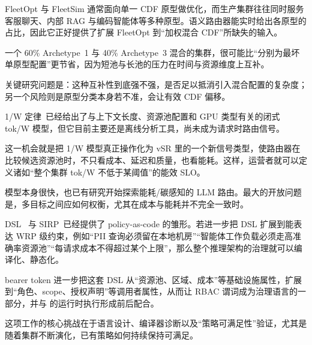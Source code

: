\begin{opportunity}[混合原型的集群配置]
\label{opp:mixed-archetype}
FleetOpt 与 FleetSim 通常面向单一 CDF 原型做优化，而生产集群往往同时服务客服聊天、内部 RAG 与编码智能体等多种原型。语义路由器能实时给出各原型的占比，因此它正好提供了扩展 FleetOpt 到“加权混合 CDF”所缺失的输入。

一个 60\% Archetype~1 与 40\% Archetype~3 混合的集群，很可能比“分别为最坏单原型配置”更节省，因为短池与长池的压力在时间与资源维度上互补。

\begin{frisk}
关键研究问题是：这种互补性到底强不强，是否足以抵消引入混合配置的复杂度；另一个风险则是原型分类本身若不准，会让有效 CDF 偏移。
\end{frisk}
\end{opportunity}

\begin{opportunity}[把能耗作为可组合路由目标]
\label{opp:energy-signal}
1/W 定律~\cite{onewlaw2026}已经给出了与上下文长度、资源池配置和 GPU 类型有关的闭式 tok/W 模型，但它目前主要还是离线分析工具，尚未成为请求时路由信号。

这一机会就是把 1/W 模型真正操作化为 vSR 里的一个新信号类型，使路由器在比较候选资源池时，不只看成本、延迟和质量，也看能耗。这样，运营者就可以定义诸如“整个集群 tok/W 不低于某阈值”的能效 SLO。

\begin{frisk}
模型本身很快，也已有研究开始探索能耗/碳感知的 LLM 路由。最大的开放问题是，多目标之间应如何权衡，尤其在成本与能耗并不完全一致时。
\end{frisk}
\end{opportunity}

\begin{opportunity}
\label{opp:governance}
\vsr{} DSL~\cite{vllmsr2026} 与 SIRP~\cite{sirp2025}已经提供了 policy-as-code 的雏形。若进一步把 DSL 扩展到能表达 WRP 级约束，例如“PII 查询必须留在本地机房”“智能体工作负载必须走高准确率资源池”“每请求成本不得超过某个上限”，那么整个推理架构的治理就可以编译化、静态化。

bearer token 进一步把这套 DSL 从“资源池、区域、成本”等基础设施属性，扩展到“角色、scope、授权声明”等调用者属性，从而让 RBAC 谓词成为治理语言的一部分，并与  的运行时执行形成前后配合。

\begin{frisk}
这项工作的核心挑战在于语言设计、编译器诊断以及“策略可满足性”验证，尤其是随着集群不断演化，已有策略如何持续保持可满足。
\end{frisk}
\end{opportunity}

